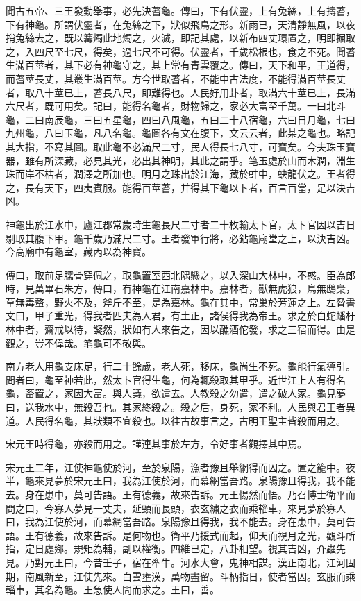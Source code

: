 聞古五帝、三王發動舉事，必先決蓍龜。傳曰，下有伏靈，上有兔絲，上有擣蓍，下有神龜。所謂伏靈者，在兔絲之下，狀似飛鳥之形。新雨已，天清靜無風，以夜捎兔絲去之，既以篝燭此地燭之，火滅，即記其處，以新布四丈環置之，明即掘取之，入四尺至七尺，得矣，過七尺不可得。伏靈者，千歲松根也，食之不死。聞蓍生滿百莖者，其下必有神龜守之，其上常有青雲覆之。傳曰，天下和平，王道得，而蓍莖長丈，其叢生滿百莖。方今世取蓍者，不能中古法度，不能得滿百莖長丈者，取八十莖已上，蓍長八尺，即難得也。人民好用卦者，取滿六十莖已上，長滿六尺者，既可用矣。記曰，能得名龜者，財物歸之，家必大富至千萬。一曰北斗龜，二曰南辰龜，三曰五星龜，四曰八風龜，五曰二十八宿龜，六曰日月龜，七曰九州龜，八曰玉龜，凡八名龜。龜圖各有文在腹下，文云云者，此某之龜也。略記其大指，不寫其圖。取此龜不必滿尺二寸，民人得長七八寸，可寶矣。今夫珠玉寶器，雖有所深藏，必見其光，必出其神明，其此之謂乎。笔玉處於山而木潤，淵生珠而岸不枯者，潤澤之所加也。明月之珠出於江海，藏於蚌中，蚗龍伏之。王者得之，長有天下，四夷賓服。能得百莖蓍，并得其下龜以卜者，百言百當，足以決吉凶。

神龜出於江水中，廬江郡常歲時生龜長尺二寸者二十枚輸太卜官，太卜官因以吉日剔取其腹下甲。龜千歲乃滿尺二寸。王者發軍行將，必鉆龜廟堂之上，以決吉凶。今高廟中有龜室，藏內以為神寶。

傳曰，取前足臑骨穿佩之，取龜置室西北隅懸之，以入深山大林中，不惑。臣為郎時，見萬畢石朱方，傳曰，有神龜在江南嘉林中。嘉林者，獸無虎狼，鳥無鴟梟，草無毒螫，野火不及，斧斤不至，是為嘉林。龜在其中，常巢於芳蓮之上。左脅書文曰，甲子重光，得我者匹夫為人君，有土正，諸侯得我為帝王。求之於白蛇蟠杅林中者，齋戒以待，譺然，狀如有人來告之，因以醮酒佗發，求之三宿而得。由是觀之，豈不偉哉。笔龜可不敬與。

南方老人用龜支床足，行二十餘歲，老人死，移床，龜尚生不死。龜能行氣導引。問者曰，龜至神若此，然太卜官得生龜，何為輒殺取其甲乎。近世江上人有得名龜，畜置之，家因大富。與人議，欲遣去。人教殺之勿遣，遣之破人家。龜見夢曰，送我水中，無殺吾也。其家終殺之。殺之后，身死，家不利。人民與君王者異道。人民得名龜，其狀類不宜殺也。以往古故事言之，古明王聖主皆殺而用之。

宋元王時得龜，亦殺而用之。謹連其事於左方，令好事者觀擇其中焉。

宋元王二年，江使神龜使於河，至於泉陽，漁者豫且舉網得而囚之。置之籠中。夜半，龜來見夢於宋元王曰，我為江使於河，而幕網當吾路。泉陽豫且得我，我不能去。身在患中，莫可告語。王有德義，故來告訴。元王惕然而悟。乃召博士衛平而問之曰，今寡人夢見一丈夫，延頸而長頭，衣玄繡之衣而乘輜車，來見夢於寡人曰，我為江使於河，而幕網當吾路。泉陽豫且得我，我不能去。身在患中，莫可告語。王有德義，故來告訴。是何物也。衛平乃援式而起，仰天而視月之光，觀斗所指，定日處鄉。規矩為輔，副以權衡。四維已定，八卦相望。視其吉凶，介蟲先見。乃對元王曰，今昔壬子，宿在牽牛。河水大會，鬼神相謀。漢正南北，江河固期，南風新至，江使先來。白雲壅漢，萬物盡留。斗柄指日，使者當囚。玄服而乘輜車，其名為龜。王急使人問而求之。王曰，善。


